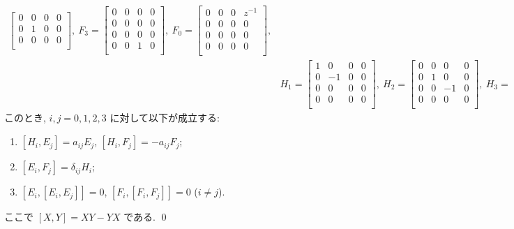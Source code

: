 \documentclass[12pt,twoside]{jarticle}
\begin{document}
\begin{question}
{\begin{align*}
\begin{bmatrix}
      0 & 0 & 0 & 0 \\
      0 & 1 & 0 & 0 \\
      0 & 0 & 0 & 0 \\
    \end{bmatrix},
    \ %
    F_3 = 
    \begin{bmatrix}
      0 & 0 & 0 & 0 \\
      0 & 0 & 0 & 0 \\
      0 & 0 & 0 & 0 \\
      0 & 0 & 1 & 0 \\
    \end{bmatrix},
    \ %
    F_0 = 
    \begin{bmatrix}
      0 & 0 & 0 & z^{-1} \\
      0 & 0 & 0 & 0 \\
      0 & 0 & 0 & 0 \\
      0 & 0 & 0 & 0 \\
    \end{bmatrix},
    \\ &
    H_1 = 
    \begin{bmatrix}
      1 & 0 & 0 & 0 \\
      0 &-1 & 0 & 0 \\
      0 & 0 & 0 & 0 \\
      0 & 0 & 0 & 0 \\
    \end{bmatrix},
    \ %
    H_2 = 
    \begin{bmatrix}
      0 & 0 & 0 & 0 \\
      0 & 1 & 0 & 0 \\
      0 & 0 &-1 & 0 \\
      0 & 0 & 0 & 0 \\
    \end{bmatrix},
    \ %
    H_3 = 
    \begin{bmatrix}
      0 & 0 & 0 & 0 \\
      0 & 0 & 0 & 0 \\
      0 & 0 & 1 & 0 \\
      0 & 0 & 0 &-1 \\
    \end{bmatrix},
    \ %
    H_0 = 
    \begin{bmatrix}
     -1 & 0 & 0 & 0 \\
      0 & 0 & 0 & 0 \\
      0 & 0 & 0 & 0 \\
      0 & 0 & 0 & 1 \\
    \end{bmatrix}.
  \end{align*}
  }このとき, $i,j=0,1,2,3$ に対して以下が成立する:
  \begin{enumerate}
  \item $[H_i, E_j] = a_{ij} E_j$, \quad $[H_i, F_j] = -a_{ij} F_j$;
  \item $[E_i, F_j] = \delta_{ij} H_i$;
  \item $[E_i,[E_i, E_j]] = 0$, \quad $[F_i,[F_i, F_j]] = 0$ \quad ($i\ne j$).
  \end{enumerate}
  ここで $[X,Y]=XY-YX$ である. \qed
\end{question}
\end{document}
